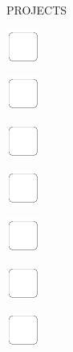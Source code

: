 \documentclass[11pt,titlepage]{article}
\begin{document}
\small %
\hfill PROJECTS

\vspace{6mm}

\noindent
\includegraphics[]{checkbox-6mm.pdf}

\vspace{12mm}

\noindent
\includegraphics[]{checkbox-6mm.pdf}

\vspace{12mm}

\noindent
\includegraphics[]{checkbox-6mm.pdf}

\vspace{12mm}

\noindent
\includegraphics[]{checkbox-6mm.pdf}

\vspace{12mm}

\noindent
\includegraphics[]{checkbox-6mm.pdf}

\vspace{12mm}

\noindent
\includegraphics[]{checkbox-6mm.pdf}

\vspace{12mm}

\noindent
\includegraphics[]{checkbox-6mm.pdf}

\vspace{12mm}
\end{document}
